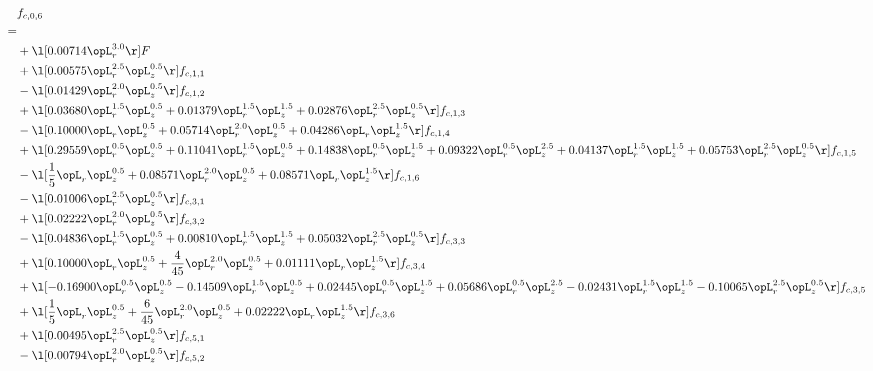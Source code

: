 \begin{alignat}{2} 
\label{eq:f_06_1} 
& f_{c,0,6} \nonumber \\ 
 = \\ 
& + \l[  0.00714 \opL_r^{3.0}  \r] F \nonumber \\ 
& + \l[  0.00575 \opL_r^{2.5} \opL_z^{0.5}  \r] f_{c,1,1} \nonumber \\ 
& - \l[  0.01429 \opL_r^{2.0} \opL_z^{0.5}  \r] f_{c,1,2} \nonumber \\ 
& + \l[  0.03680 \opL_r^{1.5} \opL_z^{0.5} +  0.01379 \opL_r^{1.5} \opL_z^{1.5} +  0.02876 \opL_r^{2.5} \opL_z^{0.5}  \r] f_{c,1,3} \nonumber \\ 
& - \l[  0.10000 \opL_r \opL_z^{0.5} +  0.05714 \opL_r^{2.0} \opL_z^{0.5} +  0.04286 \opL_r \opL_z^{1.5}  \r] f_{c,1,4} \nonumber \\ 
& + \l[  0.29559 \opL_r^{0.5} \opL_z^{0.5} +  0.11041 \opL_r^{1.5} \opL_z^{0.5} +  0.14838 \opL_r^{0.5} \opL_z^{1.5} +  0.09322 \opL_r^{0.5} \opL_z^{2.5} +  0.04137 \opL_r^{1.5} \opL_z^{1.5} +  0.05753 \opL_r^{2.5} \opL_z^{0.5}  \r] f_{c,1,5} \nonumber \\ 
& - \l[ \frac{1}{5} \opL_r \opL_z^{0.5} +  0.08571 \opL_r^{2.0} \opL_z^{0.5} +  0.08571 \opL_r \opL_z^{1.5}  \r] f_{c,1,6} \nonumber \\ 
& - \l[  0.01006 \opL_r^{2.5} \opL_z^{0.5}  \r] f_{c,3,1} \nonumber \\ 
& + \l[  0.02222 \opL_r^{2.0} \opL_z^{0.5}  \r] f_{c,3,2} \nonumber \\ 
& - \l[  0.04836 \opL_r^{1.5} \opL_z^{0.5} +  0.00810 \opL_r^{1.5} \opL_z^{1.5} +  0.05032 \opL_r^{2.5} \opL_z^{0.5}  \r] f_{c,3,3} \nonumber \\ 
& + \l[  0.10000 \opL_r \opL_z^{0.5} + \frac{4}{45} \opL_r^{2.0} \opL_z^{0.5} +  0.01111 \opL_r \opL_z^{1.5}  \r] f_{c,3,4} \nonumber \\ 
& + \l[  -0.16900 \opL_r^{0.5} \opL_z^{0.5}   -0.14509 \opL_r^{1.5} \opL_z^{0.5} +  0.02445 \opL_r^{0.5} \opL_z^{1.5} +  0.05686 \opL_r^{0.5} \opL_z^{2.5}   -0.02431 \opL_r^{1.5} \opL_z^{1.5}   -0.10065 \opL_r^{2.5} \opL_z^{0.5}  \r] f_{c,3,5} \nonumber \\ 
& + \l[ \frac{1}{5} \opL_r \opL_z^{0.5} + \frac{6}{45} \opL_r^{2.0} \opL_z^{0.5} +  0.02222 \opL_r \opL_z^{1.5}  \r] f_{c,3,6} \nonumber \\ 
& + \l[  0.00495 \opL_r^{2.5} \opL_z^{0.5}  \r] f_{c,5,1} \nonumber \\ 
& - \l[  0.00794 \opL_r^{2.0} \opL_z^{0.5}  \r] f_{c,5,2} \nonumber \\ 

\end{alignat}
